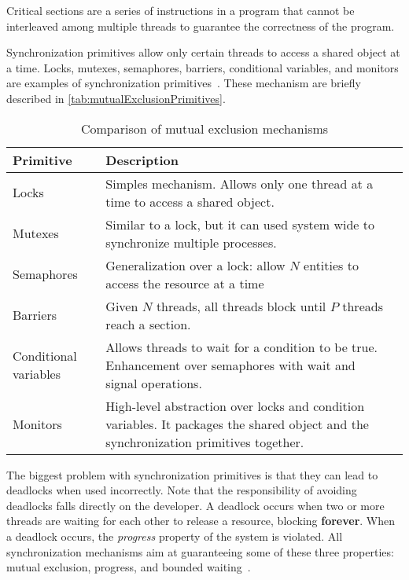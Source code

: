 \begin{tcolorbox}[colback=blue!5!white, colframe=blue!75!black, title=Critical Section]
    Critical sections are a series of instructions in a program that cannot
    be interleaved among multiple threads to guarantee the correctness of the program.
\end{tcolorbox}

Synchronization primitives allow
only certain threads to access a shared object at a time.
Locks, mutexes, semaphores, barriers, conditional variables, and monitors
are examples of synchronization primitives~\cite{andrews1983conceptsOfConcurrency,csf2025synchronizationPrimitives}.
These mechanism are briefly described in \autoref{tab:mutualExclusionPrimitives}.

\begin{table}[!htp]
    \caption{Comparison of mutual exclusion mechanisms}
    \label{tab:mutualExclusionPrimitives}
    \centering
    \begin{tabularx}{\textwidth}{|l|X|X|}
        \hline
        \textbf{Primitive} & \textbf{Description}\\
        \hline
        Locks & 
        Simples mechanism. Allows only one thread at a time to access a shared object.\\
        \hline
        Mutexes & 
        Similar to a lock, but it can used system wide to synchronize multiple processes.\\
        \hline
        Semaphores & 
        Generalization over a lock: allow $N$ entities to access the resource at a time\\
        \hline
        Barriers &
        Given $N$ threads, all threads block until $P$ threads reach a section.\\
        \hline
        Conditional variables &
        Allows threads to wait for a condition to be true. Enhancement
        over semaphores with wait and signal operations.\\
        \hline
        Monitors &
        High-level abstraction over locks and condition variables. It packages
        the shared object and the synchronization primitives together.\\
        \hline
    \end{tabularx}
\end{table}

The biggest problem with synchronization primitives is that they can
lead to deadlocks when used incorrectly. Note that
the responsibility of avoiding deadlocks falls directly on the developer.
A deadlock occurs when two or more threads are waiting
for each other to release a resource, blocking \textbf{forever}.
When a deadlock occurs, the \textit{progress} property
of the system is violated. All synchronization mechanisms aim
at guaranteeing some of these three properties:
mutual exclusion, progress, and bounded waiting~\cite{csf2025synchronizationPrimitives}.


